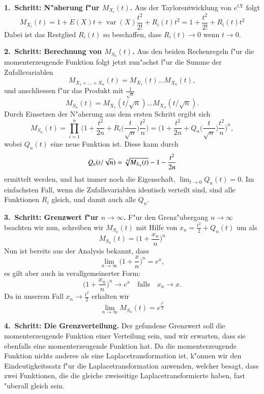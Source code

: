 {\parindent0pt\bf 1.~Schritt: N"aherung f"ur $M_{X_i}(t)$.} 
Aus der Taylorentwicklung von $e^{tX}$ folgt
\[
M_{X_i}(t)=1+E(X)t+\operatorname{var}(X)\frac{t^2}{2!}+R_i(t)t^2
=1+\frac{t^2}{2!}+R_i(t)t^2
\]
Dabei ist das Restglied $R_i(t)$ so beschaffen, dass
$R_i(t)\to 0$ wenn $t\to 0$.

\medskip
{\parindent0pt\bf 2.~Schritt: Berechnung von $M_{S_n}(t)$.}
Aus den beiden Rechenregeln f"ur die momenterzeugende Funktion folgt
jetzt zun"achst f"ur die Summe der Zufallsvariablen
\[
M_{X_1+\dots+X_n}(t)=M_{X_1}(t)\dots M_{X_n}(t),
\]
und anschliessen f"ur das Produkt mit $\frac1{\sqrt{n}}$
\[
M_{S_n}(t)=M_{X_1}(t/\sqrt{n})\dots M_{X_n}(t/\sqrt{n}).
\]
Durch Einsetzen der N"aherung aus dem ersten Schritt ergibt sich
\[
M_{S_n}(t)
=\prod_{i=1}^n\biggl(1+\frac{t^2}{2n}+R_i\biggl(\frac{t}{\sqrt{n}}\biggl)\frac{t^2}{n}\biggr)
=\biggl(1+\frac{t^2}{2n}+Q_n\biggl(\frac{t}{\sqrt{n}}\biggr)\frac{t^2}{n}\biggr)^n,
\]
wobei $Q_n(t)$ eine neue Funktion ist.
Diese kann durch
\[
Q_n(t/\sqrt{n})=\root{n}\of{M_{S_n}(t)}-1-\frac{t^2}{2n}
\]
ermittelt werden, und hat immer noch die Eigenschaft,
$\lim_{t\to0}Q_n(t)=0$.
Im einfachsten Fall, wenn die Zufallsvariablen
identisch verteilt sind, sind alle Funktionen $R_i$ gleich, und damit
auch alle $Q_n$.

\medskip
{\parindent0pt\bf 3.~Schritt: Grenzwert f"ur $n\to\infty$.}
F"ur den Grenz"ubergang $n\to\infty$ beachten wir nun, schreiben wir
$M_{S_n}(t)$ mit Hilfe von
$x_n=\frac{t^2}2+Q_n(t)$
um als
\[
M_{S_n}(t)=\biggl(1+\frac{x_n}n\biggr)^n
\]
Nun ist bereits aus der Analysis bekannt, dass
\[
\lim_{n\to\infty}\biggl(1+\frac{x}{n}\biggr)^n=e^x,
\]
es gilt aber auch in verallgemeinerter Form:
\[
\biggl(1+\frac{x_n}{n}\biggr)^n\to e^x\quad\text{falls}\quad x_n\to x.
\]
Da in unserem Fall $x_n\to \frac{t^2}2$ erhalten wir
\[
\lim_{n\to\infty}M_{S_n}(t)=e^{\frac{t^2}{2}}
\]

\medskip
{\parindent0pt\bf 4.~Schritt: Die Grenzverteilung.}
Der gefundene Grenzwert soll die momenterzeugende Funktion einer
Verteilung sein, und wir erwarten, dass sie ebenfalls eine
momenterzeugende Funktion hat.
Da die momenterzeugende Funktion
nichts anderes als eine Laplacetransformation ist, k"onnen wir
den Eindeutigkeitssatz f"ur die Laplacetransformation anwenden,
welcher besagt, dass zwei Funktionen, die die gleiche zweiseitige
Laplacetransformierte haben, fast "uberall gleich sein.

